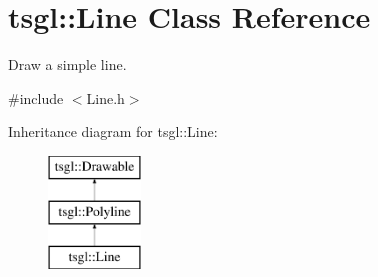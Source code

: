 \hypertarget{classtsgl_1_1_line}{}\section{tsgl\+:\+:Line Class Reference}
\label{classtsgl_1_1_line}


Draw a simple line.  




{\ttfamily \#include $<$Line.\+h$>$}

Inheritance diagram for tsgl\+:\+:Line\+:\begin{figure}[H]
\begin{center}
\leavevmode
\includegraphics[height=3.000000cm]{classtsgl_1_1_line}
\end{center}
\end{figure}

